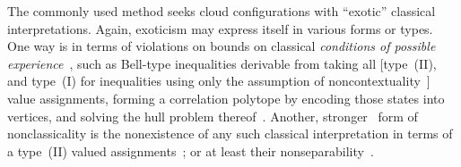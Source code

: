 \documentclass[%
  reprint,
  twocolumn,
 showpacs,
 showkeys,
 preprintnumbers,
 amsmath,amssymb,
 aps,
  prl,
  longbibliography,
 ]{revtex4-1}
\begin{document}
The commonly used method seeks cloud configurations with ``exotic'' classical interpretations.
Again, exoticism may express itself in various forms or types.
One way is in terms of violations on bounds on classical {\em conditions of possible experience}~\cite[p.~229]{Boole-62},
such as Bell-type inequalities derivable from taking all [type~(II),
and type~(I) for inequalities using only the assumption of noncontextuality~\cite{cabello:210401}] value assignments,
forming a correlation polytope by encoding those states into vertices, and solving the hull problem
thereof~\cite{froissart-81,cirelson,pitowsky-86,pitowsky,pitowsky-89a,Pit-91,Pit-94,2000-poly}.
Another, stronger~\cite{svozil-2011-enough} form of nonclassicality is the nonexistence
of any such classical interpretation in terms of a type~(II) valued
assignments~\cite{Gleason,specker-60,Zierler1975,kochen1,pitowsky:218};
or at least their nonseparability~\cite[Theorem~0, p.~67]{kochen1}.
\end{document}
